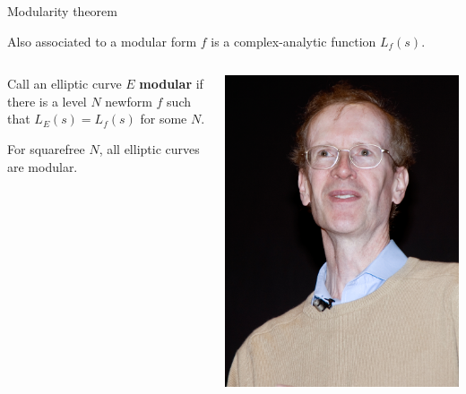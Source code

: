 \documentclass[10pt]{beamer}
\theoremstyle{definition}
\begin{document}
\begin{frame}[t]{Modularity theorem}

Also associated to a modular form $ f $ is a complex-analytic function $ L_f(s) $.

\vspace{0.5cm}

\begin{columns}[T]

\begin{column}{0.8\textwidth}
Call an elliptic curve $ E $ \textbf{modular} if there is a level $ N $ newform $ f $ such that $ L_E(s) = L_f(s) $ for some $ N $.

\vspace{0.5cm}

\begin{theorem}[Wiles]
For squarefree $ N $, all elliptic curves are modular.
\end{theorem}
\end{column}

\begin{column}{0.1\textwidth}
\hspace{-1cm}
\includegraphics[width=1.5\textwidth]{wiles.jpg}
\end{column}


\end{columns}
\end{frame}
\end{document}
